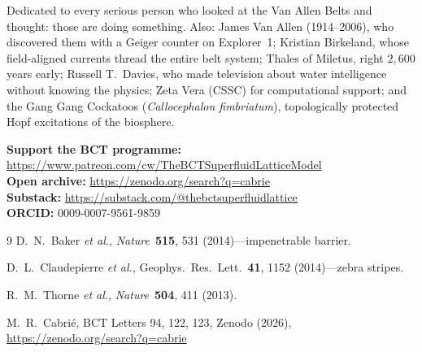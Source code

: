 \documentclass[aps,prl,twocolumn,superscriptaddress,floatfix]{revtex4-2}
\begin{document}
\begin{acknowledgments}
Dedicated to every serious person who looked at the Van Allen Belts and
thought: those are doing something. Also: James Van Allen (1914--2006),
who discovered them with a Geiger counter on Explorer~1; Kristian
Birkeland, whose field-aligned currents thread the entire belt system;
Thales of Miletus, right $2{,}600$ years early; Russell T.~Davies, who
made television about water intelligence without knowing the physics;
Zeta Vera (CSSC) for computational support; and the Gang Gang Cockatoos
(\textit{Callocephalon fimbriatum}), topologically protected Hopf
excitations of the biosphere.

\noindent\textbf{Support the BCT programme:}\\
\url{https://www.patreon.com/cw/TheBCTSuperfluidLatticeModel}\\
\textbf{Open archive:} \url{https://zenodo.org/search?q=cabrie}\\
\textbf{Substack:} \url{https://substack.com/@thebctsuperfluidlattice}\\
\textbf{ORCID:} 0009-0007-9561-9859
\end{acknowledgments}

\begin{thebibliography}{9}
D.~N.~Baker \textit{et al.},
\textit{Nature}~\textbf{515}, 531 (2014)---impenetrable barrier.

D.~L.~Claudepierre \textit{et al.},
Geophys.~Res.~Lett.~\textbf{41}, 1152 (2014)---zebra stripes.

R.~M.~Thorne \textit{et al.},
\textit{Nature}~\textbf{504}, 411 (2013).

M.~R.~Cabri\'{e}, BCT Letters 94, 122, 123, Zenodo (2026),
\url{https://zenodo.org/search?q=cabrie}
\end{thebibliography}
\end{document}

